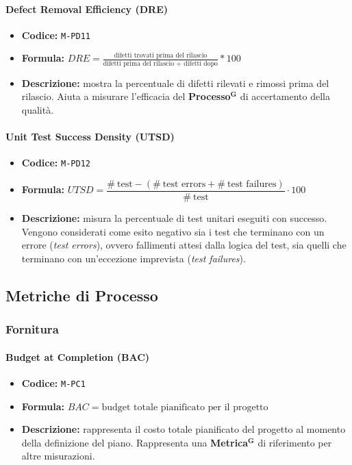 \documentclass[a4paper,12pt]{article}
\newcommand{\term}[1]{\textbf{#1}$^\mathbf{G}$}
\begin{document}
\paragraph{Defect Removal Efficiency (DRE)}
\begin{itemize}
    \item \textbf{Codice:} \texttt{M-PD11}
        \item \textbf{Formula:} $DRE=\frac{\text{difetti trovati prima del rilascio}}{\text{difetti prima del rilascio + difetti dopo}}*100$
    \item \textbf{Descrizione:} mostra la percentuale di difetti rilevati e rimossi prima del rilascio. Aiuta a misurare l'efficacia del \term{Processo} di accertamento della qualità. 
\end{itemize}

\paragraph{Unit Test Success Density (UTSD)}
\begin{itemize}
\item \textbf{Codice:} \texttt{M-PD12}
\item \textbf{Formula:} $UTSD = \dfrac{\#\ \text{test} - (\#\ \text{test errors} + 
\#\ \text{test failures})}{\#\ \text{test}} \cdot 100$
\item \textbf{Descrizione:} misura la percentuale di test unitari eseguiti con 
successo. Vengono considerati come esito negativo sia i test che terminano con 
un errore (\textit{test errors}), ovvero fallimenti attesi dalla logica del test, 
sia quelli che terminano con un'eccezione imprevista (\textit{test failures}).
\end{itemize}

\subsection{Metriche di Processo}

\subsubsection{Fornitura}

\paragraph{Budget at Completion (BAC)}
\begin{itemize}
    \item \textbf{Codice:} \texttt{M-PC1}
    \item \textbf{Formula:} $BAC=\text{budget totale pianificato per il progetto}$
    \item \textbf{Descrizione:} rappresenta il costo totale pianificato del progetto al momento della definizione del piano. Rappresenta una \term{Metrica} di riferimento per altre misurazioni.
\end{itemize}
\end{document}
